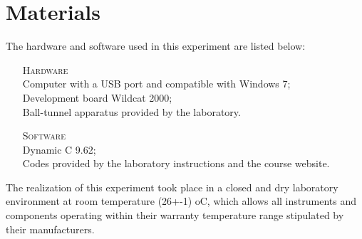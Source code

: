 \section{Materials}

The hardware and software used in this experiment are listed below:

\begin{enumerate}[(i)]
\item[\textsc{Hardware}] \hfill
\\ Computer with a USB port and compatible with Windows 7;
\\ Development board Wildcat 2000;
\\ Ball-tunnel apparatus provided by the laboratory.
\\
\item[\textsc{Software}] \hfill
\\ Dynamic C 9.62;
\\ Codes provided by the laboratory instructions and the course website.
\\
\end{enumerate}

The realization of this experiment took place in a closed and dry laboratory environment at room temperature (26+-1)  oC, which allows all instruments and components operating within their warranty temperature range stipulated by their manufacturers.
